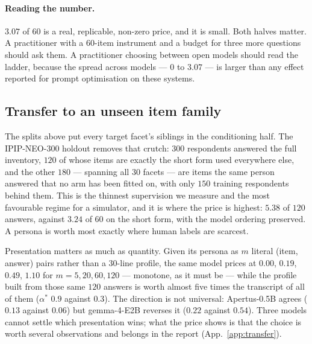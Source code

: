 \begin{table}[t]\centering\footnotesize

\caption{Answer-equivalent on IPIP-NEO-120, averaged over both panels. $S$ is the
normalised ordinal RPS of the raw readout. $\alpha^{*}$ is the selected
calibration coefficient. Raw accuracy does not order the ladder;
$\alpha^{*}$ does.}
\label{tab:ladder}
\end{table}

\paragraph{Reading the number.} $3.07$ of $60$ is a real, replicable, non-zero
price, and it is small. Both halves matter. A practitioner with a $60$-item
instrument and a budget for three more questions should ask them. A practitioner
choosing between open models should read the ladder, because the spread across
models --- $0$ to $3.07$ --- is larger than any effect reported for prompt
optimisation on these systems.

\subsection{Transfer to an unseen item family}
\label{sec:transfer}

The splits above put every target facet's siblings in the conditioning half. The
IPIP-NEO-300 holdout removes that crutch: $300$ respondents answered the full
inventory, $120$ of whose items are exactly the short form used everywhere else,
and the other $180$ --- spanning all $30$ facets --- are items the same person
answered that no arm has been fitted on, with only $150$ training respondents
behind them. This is the thinnest supervision we measure and the most favourable
regime for a simulator, and it is where the price is highest: $\mathbf{5.38}$ of
$120$ answers, against $3.24$ of $60$ on the short form, with the model ordering
preserved. A persona is worth most exactly where human labels are scarcest.

Presentation matters as much as quantity. Given its persona as $m$ literal (item,
answer) pairs rather than a $30$-line profile, the same model prices at $0.00$,
$0.19$, $0.49$, $1.10$ for $m{=}5,20,60,120$ --- monotone, as it must be --- while
the profile built from those same $120$ answers is worth almost five times the
transcript of all of them ($\alpha^{*}$ $0.9$ against $0.3$). The direction is not
universal: Apertus-0.5B agrees ($0.13$ against $0.06$) but gemma-4-E2B reverses it
($0.22$ against $0.54$). Three models cannot settle which presentation wins; what
the price shows is that the choice is worth several observations and belongs in
the report (App.~\ref{app:transfer}).

